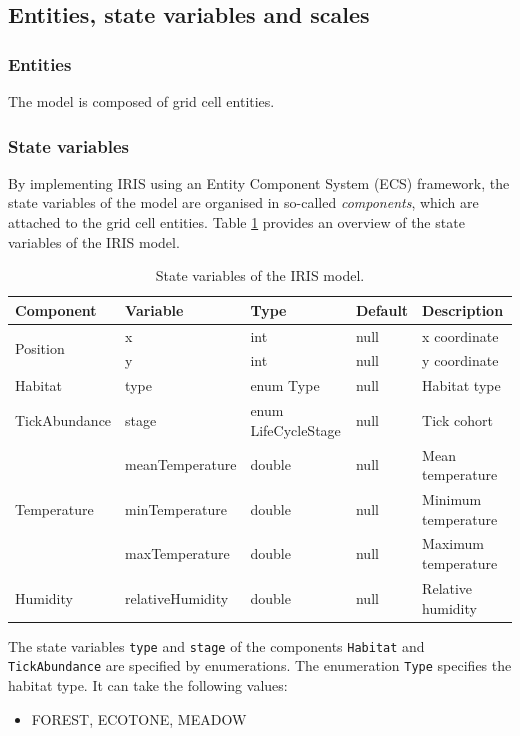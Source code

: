 \documentclass[a4paper, 11pt]{scrartcl}
\newcommand{\inlinecode}[1]{\texttt{\small #1}}
\begin{document}
\subsection{Entities, state variables and scales}

\subsubsection{Entities}
The model is composed of grid cell entities.

\subsubsection{State variables}
By implementing IRIS using an Entity Component System (ECS) framework, the state variables of the model are organised in so-called \textit{components}, which are attached to the grid cell entities. Table \ref{tab:state_variables} provides an overview of the state variables of the IRIS model.

\begin{table}[H]
	\caption{State variables of the IRIS model.}
	\label{tab:state_variables}
	\begin{tabularx}{\textwidth}{lllll}
		\toprule
		\textbf{Component} & \textbf{Variable} & \textbf{Type} & \textbf{Default} & \textbf{Description} \\
		\midrule
		\multirow{2}{*}{Position} 	 & x  				& int  		& null & x coordinate \\
									 & y    			& int  		& null & y coordinate \\
		Habitat 				  	 & type 			& enum Type & null & Habitat type \\
		TickAbundance 			  	 & stage 			& enum LifeCycleStage  & null & Tick cohort \\
		\multirow{3}{*}{Temperature} & meanTemperature  & double  	& null & Mean temperature \\
									 & minTemperature   & double  	& null & Minimum temperature \\
									 & maxTemperature   & double  	& null & Maximum temperature \\
		Humidity 					 & relativeHumidity & double  	& null & Relative humidity \\
		\bottomrule
	\end{tabularx}
\end{table}

The state variables \inlinecode{type} and \inlinecode{stage} of the components \inlinecode{Habitat} and \inlinecode{TickAbundance} are specified by enumerations. The enumeration \inlinecode{Type} specifies the habitat type. It can take the following values:
\begin{small}
\begin{itemize}
	\item FOREST, ECOTONE, MEADOW
\end{itemize}
\end{small}
\end{document}

